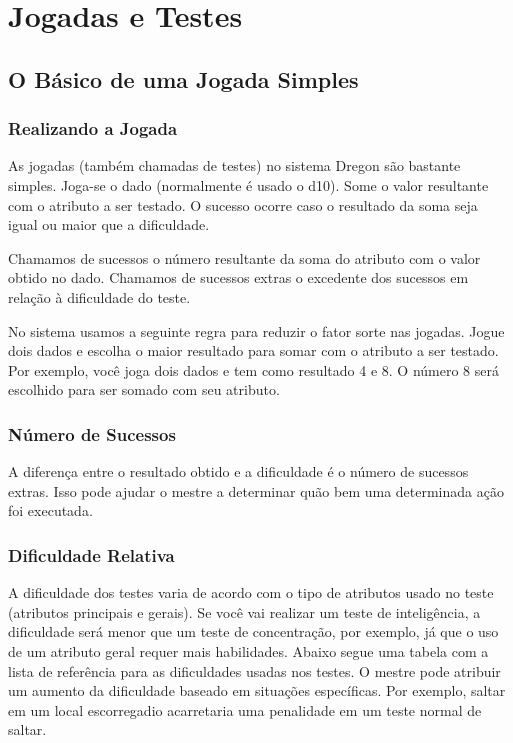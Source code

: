
\chapter{Jogadas e Testes}
\label{Cap:testes}

\section{O Básico de uma Jogada Simples}

\subsection{Realizando a Jogada}

As jogadas (também chamadas de testes) no sistema Dregon são bastante simples. Joga-se o dado (normalmente é usado o d10). Some o valor resultante com o atributo a ser testado. O sucesso ocorre caso o resultado da soma seja igual ou maior que a dificuldade.

Chamamos de sucessos o número resultante da soma do atributo com o valor obtido no dado. Chamamos de sucessos extras o excedente dos sucessos em relação à dificuldade do teste.   

No sistema usamos a seguinte regra para reduzir o fator sorte nas jogadas. Jogue dois dados e escolha o maior resultado para somar com o atributo a ser testado. Por exemplo, você joga dois dados e tem como resultado 4 e 8. O número 8 será escolhido para ser somado com seu atributo. 

\subsection{Número de Sucessos}
A diferença entre o resultado obtido e a dificuldade é o número de sucessos extras. Isso pode ajudar o mestre a determinar quão bem uma determinada ação foi executada.

\subsection{Dificuldade Relativa}

A dificuldade dos testes varia de acordo com o tipo de atributos usado no teste (atributos principais e gerais). Se você vai realizar um teste de inteligência, a dificuldade será menor que um teste de concentração, por exemplo, já que o uso de um atributo geral requer mais habilidades.
Abaixo segue uma tabela com a lista de referência para as dificuldades usadas nos testes. O mestre pode atribuir um aumento da dificuldade baseado em situações específicas. Por exemplo, saltar em um local escorregadio acarretaria uma penalidade em um teste normal de saltar.

